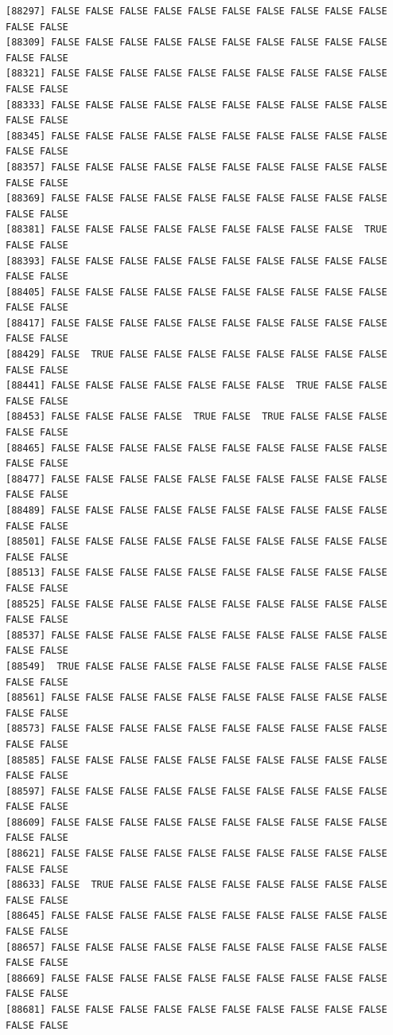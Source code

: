 \documentclass[
  a4paper,
  DIV=11,
  numbers=noendperiod]{scrartcl}
\begin{document}
\begin{verbatim}
[88297] FALSE FALSE FALSE FALSE FALSE FALSE FALSE FALSE FALSE FALSE FALSE FALSE
[88309] FALSE FALSE FALSE FALSE FALSE FALSE FALSE FALSE FALSE FALSE FALSE FALSE
[88321] FALSE FALSE FALSE FALSE FALSE FALSE FALSE FALSE FALSE FALSE FALSE FALSE
[88333] FALSE FALSE FALSE FALSE FALSE FALSE FALSE FALSE FALSE FALSE FALSE FALSE
[88345] FALSE FALSE FALSE FALSE FALSE FALSE FALSE FALSE FALSE FALSE FALSE FALSE
[88357] FALSE FALSE FALSE FALSE FALSE FALSE FALSE FALSE FALSE FALSE FALSE FALSE
[88369] FALSE FALSE FALSE FALSE FALSE FALSE FALSE FALSE FALSE FALSE FALSE FALSE
[88381] FALSE FALSE FALSE FALSE FALSE FALSE FALSE FALSE FALSE  TRUE FALSE FALSE
[88393] FALSE FALSE FALSE FALSE FALSE FALSE FALSE FALSE FALSE FALSE FALSE FALSE
[88405] FALSE FALSE FALSE FALSE FALSE FALSE FALSE FALSE FALSE FALSE FALSE FALSE
[88417] FALSE FALSE FALSE FALSE FALSE FALSE FALSE FALSE FALSE FALSE FALSE FALSE
[88429] FALSE  TRUE FALSE FALSE FALSE FALSE FALSE FALSE FALSE FALSE FALSE FALSE
[88441] FALSE FALSE FALSE FALSE FALSE FALSE FALSE  TRUE FALSE FALSE FALSE FALSE
[88453] FALSE FALSE FALSE FALSE  TRUE FALSE  TRUE FALSE FALSE FALSE FALSE FALSE
[88465] FALSE FALSE FALSE FALSE FALSE FALSE FALSE FALSE FALSE FALSE FALSE FALSE
[88477] FALSE FALSE FALSE FALSE FALSE FALSE FALSE FALSE FALSE FALSE FALSE FALSE
[88489] FALSE FALSE FALSE FALSE FALSE FALSE FALSE FALSE FALSE FALSE FALSE FALSE
[88501] FALSE FALSE FALSE FALSE FALSE FALSE FALSE FALSE FALSE FALSE FALSE FALSE
[88513] FALSE FALSE FALSE FALSE FALSE FALSE FALSE FALSE FALSE FALSE FALSE FALSE
[88525] FALSE FALSE FALSE FALSE FALSE FALSE FALSE FALSE FALSE FALSE FALSE FALSE
[88537] FALSE FALSE FALSE FALSE FALSE FALSE FALSE FALSE FALSE FALSE FALSE FALSE
[88549]  TRUE FALSE FALSE FALSE FALSE FALSE FALSE FALSE FALSE FALSE FALSE FALSE
[88561] FALSE FALSE FALSE FALSE FALSE FALSE FALSE FALSE FALSE FALSE FALSE FALSE
[88573] FALSE FALSE FALSE FALSE FALSE FALSE FALSE FALSE FALSE FALSE FALSE FALSE
[88585] FALSE FALSE FALSE FALSE FALSE FALSE FALSE FALSE FALSE FALSE FALSE FALSE
[88597] FALSE FALSE FALSE FALSE FALSE FALSE FALSE FALSE FALSE FALSE FALSE FALSE
[88609] FALSE FALSE FALSE FALSE FALSE FALSE FALSE FALSE FALSE FALSE FALSE FALSE
[88621] FALSE FALSE FALSE FALSE FALSE FALSE FALSE FALSE FALSE FALSE FALSE FALSE
[88633] FALSE  TRUE FALSE FALSE FALSE FALSE FALSE FALSE FALSE FALSE FALSE FALSE
[88645] FALSE FALSE FALSE FALSE FALSE FALSE FALSE FALSE FALSE FALSE FALSE FALSE
[88657] FALSE FALSE FALSE FALSE FALSE FALSE FALSE FALSE FALSE FALSE FALSE FALSE
[88669] FALSE FALSE FALSE FALSE FALSE FALSE FALSE FALSE FALSE FALSE FALSE FALSE
[88681] FALSE FALSE FALSE FALSE FALSE FALSE FALSE FALSE FALSE FALSE FALSE FALSE

\end{verbatim}
\end{document}

